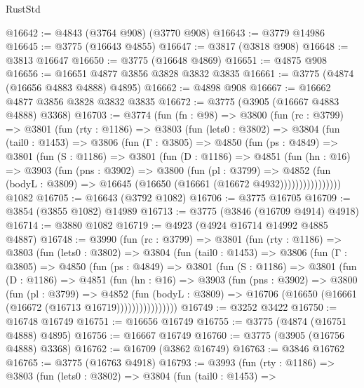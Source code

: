 \begin{lexlean}{RustStd}
\begin{coremodule}
@16642 := @4843 (@3764 @908) (@3770 @908)
@16643 := @3779 @14986
@16645 := @3775 (@16643 @4855)
@16647 := @3817 (@3818 @908)
@16648 := @3813 @16647
@16650 := @3775 (@16648 @4869)
@16651 := @4875 @908
@16656 := @16651 @4877 @3856 @3828 @3832 @3835
@16661 := @3775 (@4874 (@16656 @4883 @4888) @4895)
@16662 := @4898 @908
@16667 := @16662 @4877 @3856 @3828 @3832 @3835
@16672 := @3775 (@3905 (@16667 @4883 @4888) @3368)
@16703 := @3774
    (fun (fn : @98) =>
    @3800
      (fun (rc : @3799) =>
      @3801
        (fun (rty : @1186) =>
        @3803
          (fun (lets0 : @3802) =>
          @3804
            (fun (tail0 : @1453) =>
            @3806
              (fun (Γ : @3805) =>
              @4850
                (fun (ps : @4849) =>
                @3801
                  (fun (S : @1186) =>
                  @3801
                    (fun (D : @1186) =>
                    @4851
                      (fun (hn : @16) =>
                      @3903
                        (fun (pns : @3902) =>
                        @3800
                          (fun (pl : @3799) =>
                          @4852
                            (fun (bodyL : @3809) =>
                            @16645 (@16650 (@16661 (@16672 @4932))))))))))))))))
    @1082
@16705 := @16643 (@3792 @1082)
@16706 := @3775 @16705
@16709 := @3854 (@3855 @1082) @14989
@16713 := @3775 (@3846 (@16709 @4914) @4918)
@16714 := @3880 @1082
@16719 := @4923 (@4924 @16714 @14992 @4885 @4887)
@16748 := @3990
    (fun (rc : @3799) =>
    @3801
      (fun (rty : @1186) =>
      @3803
        (fun (lets0 : @3802) =>
        @3804
          (fun (tail0 : @1453) =>
          @3806
            (fun (Γ : @3805) =>
            @4850
              (fun (ps : @4849) =>
              @3801
                (fun (S : @1186) =>
                @3801
                  (fun (D : @1186) =>
                  @4851
                    (fun (hn : @16) =>
                    @3903
                      (fun (pns : @3902) =>
                      @3800
                        (fun (pl : @3799) =>
                        @4852
                          (fun (bodyL : @3809) =>
                          @16706 (@16650 (@16661 (@16672 (@16713 @16719))))))))))))))))
@16749 := @3252 @3422
@16750 := @16748 @16749
@16751 := @16656 @16749
@16755 := @3775 (@4874 (@16751 @4888) @4895)
@16756 := @16667 @16749
@16760 := @3775 (@3905 (@16756 @4888) @3368)
@16762 := @16709 (@3862 @16749)
@16763 := @3846 @16762
@16765 := @3775 (@16763 @4918)
@16793 := @3993
    (fun (rty : @1186) =>
    @3803
      (fun (lets0 : @3802) =>
      @3804
        (fun (tail0 : @1453) =>

\end{coremodule}
\end{lexlean}
